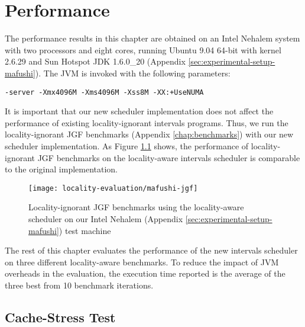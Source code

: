 
\chapter{Performance}
\label{chap:locality-performance}

The performance results in this chapter are obtained on an Intel
Nehalem system with two processors and eight cores, running Ubuntu
9.04 64-bit with kernel 2.6.29 and Sun Hotspot JDK 1.6.0\_20 (Appendix
\ref{sec:experimental-setup-mafushi}). The JVM is invoked with the
following parameters:

\begin{lstlisting}[style=Listing]
  -server -Xmx4096M -Xms4096M -Xss8M -XX:+UseNUMA
\end{lstlisting}

It is important that our new scheduler implementation does not affect
the performance of existing locality-ignorant intervals
programs. Thus, we run the locality-ignorant JGF benchmarks (Appendix
\ref{chap:benchmarks}) with our new scheduler implementation. As
Figure \ref{fig:locality-evaluation-jgf} shows, the performance of
locality-ignorant JGF benchmarks on the locality-aware intervals
scheduler is comparable to the original implementation.

\begin{figure}[!ht]
  \centering
  \texttt{[image: locality-evaluation/mafushi-jgf]}
  \caption[Locality-ignorant JGF benchmarks running on locality-aware
  scheduler]{Locality-ignorant JGF benchmarks using the locality-aware
    scheduler on our Intel Nehalem (Appendix
    \ref{sec:experimental-setup-mafushi}) test machine}
  \label{fig:locality-evaluation-jgf}
\end{figure}

The rest of this chapter evaluates the performance of the new
intervals scheduler on three different locality-aware benchmarks. To
reduce the impact of JVM overheads in the evaluation, the execution
time reported is the average of the three best from 10 benchmark
iterations.

\section{Cache-Stress Test}
\label{sec:locality-performance-cache-stress-test}

